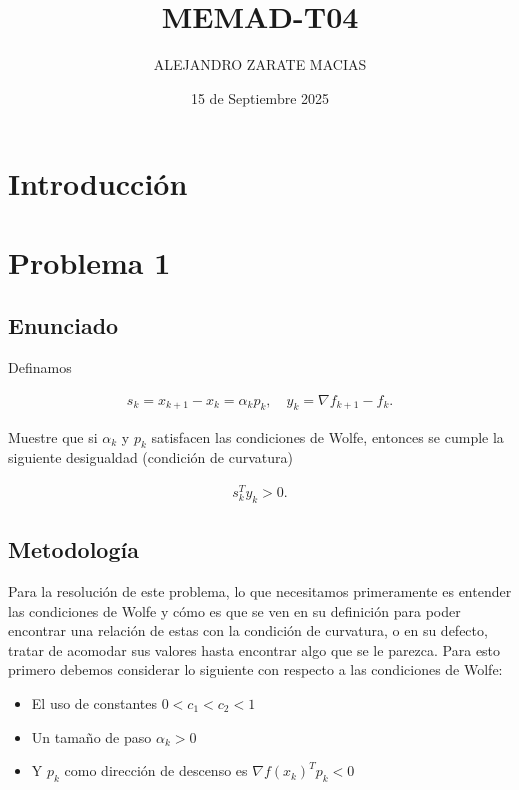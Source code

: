 \documentclass{article}
\title{MEMAD-T04}
\author{ALEJANDRO ZARATE MACIAS}
\date{15 de Septiembre 2025}
\begin{document}
\maketitle

\section*{Introducción}


\section{Problema 1}

\subsection{Enunciado}

Definamos 

\begin{align*}
    s_k = x_{k+1} - x_k = \alpha_k p_k, \quad y_k = \nabla f_{k+1} - f_k.
\end{align*}

Muestre que si $\alpha_k$ y $p_k$ satisfacen las condiciones de Wolfe, entonces se cumple la siguiente desigualdad (condición de curvatura)

\begin{align}
    s_k^Ty_k > 0. 
\end{align}

\subsection{Metodología}

Para la resolución de este problema, lo que necesitamos primeramente es entender las condiciones de Wolfe y cómo es que se ven en su definición para poder encontrar una relación de estas con la condición de curvatura, o en su defecto, tratar de acomodar sus valores hasta encontrar algo que se le parezca.
Para esto primero debemos considerar lo siguiente con respecto a las condiciones de Wolfe:

\begin{itemize}
    \item El uso de constantes $0 < c_1 < c_2 < 1$
    \item Un tamaño de paso $\alpha_k > 0$
    \item Y $p_k$ como dirección de descenso es $\nabla f(x_k)^Tp_k<0$
\end{itemize}
\end{document}

